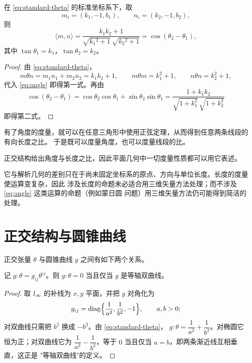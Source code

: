 \begin{proposition}[与斜率的关系]
在 \eqref{eq:standard-theta} 的标准坐标系下，取
\[
m_i=(k_1,-1,b_1),\qquad n_i=(k_2,-1,b_2),
\]
则
\begin{equation}
\langle m,n\rangle
=\frac{k_1k_2+1}{\sqrt{k_1{}^2+1}\,\sqrt{k_2{}^2+1}}
=\cos(\theta_2-\theta_1),
\label{eq:cos-angle}
\end{equation}
其中 $\tan\theta_1=k_1$，$\tan\theta_2=k_2$。
\end{proposition}

\begin{proof}
由 \eqref{eq:standard-theta}，
\[
m\theta n=m_1n_1+m_2n_2=k_1k_2+1,\qquad
m\theta m=k_1^2+1,\qquad
n\theta n=k_2^2+1,
\]
代入 \eqref{eq:angle} 即得第一式。再由
\[
\cos(\theta_2-\theta_1)=\cos\theta_2\cos\theta_1+\sin\theta_2\sin\theta_1
=\frac{1+k_1k_2}{\sqrt{1+k_1^2}\,\sqrt{1+k_2^2}}
\]
即得第二式。
\end{proof}

有了角度的度量，就可以在任意三角形中使用正弦定理，从而得到任意两条线段的有向长度之比。
于是既可以度量角度，也可以度量线段的比。

\begin{proposition}[正交几何的内容]
正交结构给出角度与长度之比，因此平面几何中一切度量性质都可以用它表述。
\end{proposition}

它与解析几何的差别只在于尚未固定坐标系的原点、方向与单位长度。长度的度量使运算变复杂，因此
涉及长度的命题未必适合用三维矢量方法处理；而不涉及 \eqref{eq:angle} 这类运算的命题（例如蒙日圆
问题）用三维矢量方法仍可能得到简洁的处理。

\section{正交结构与圆锥曲线}

正交张量 $\theta$ 与圆锥曲线 $g$ 之间有如下两个关系。

\begin{proposition}[等轴双曲线]
记 $g:\theta=g_{ij}\theta^{ij}$。则 $g:\theta=0$ 当且仅当 $g$ 是等轴双曲线。
\end{proposition}

\begin{proof}
取 $l_{\infty}$ 的补线为 $x,y$ 平面，并把 $g$ 对角化为
\[
g_{ij}=\operatorname{diag}\Bigl\{\frac{1}{a^2},\frac{1}{b^2},-1\Bigr\},
\qquad a,b>0 ;
\]
对双曲线只需把 $b^2$ 换成 $-b^2$。由 \eqref{eq:standard-theta}，
$g:\theta=\dfrac{1}{a^2}+\dfrac{1}{b^2}$。对椭圆它恒为正；对双曲线它为
$\dfrac{1}{a^2}-\dfrac{1}{b^2}$，等于 $0$ 当且仅当 $a=b$，即两条渐近线互相垂直，这正是
"等轴双曲线"的定义。
\end{proof}

